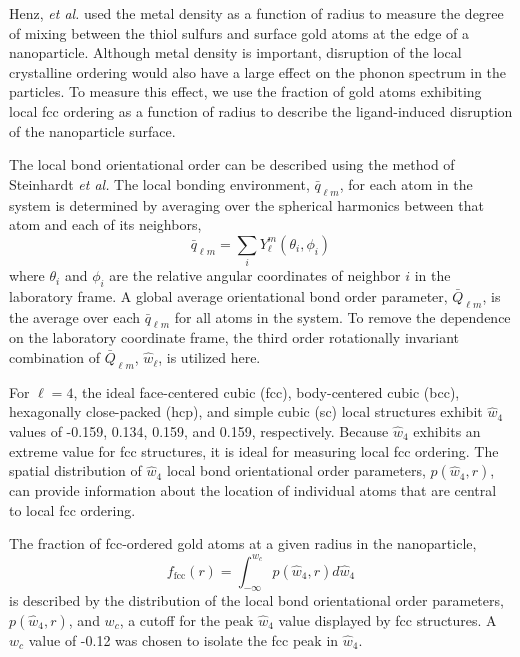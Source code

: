 \documentclass[aps,jcp,preprint,showpacs,superscriptaddress,groupedaddress]{revtex4-1}  %
\begin{document}
Henz, \textit{et al.}\cite{Henz:2008qf} used the metal
density as a function of radius to measure the degree of mixing
between the thiol sulfurs and surface gold atoms at the edge of a
nanoparticle. Although metal density is important, disruption of the
local crystalline ordering would also have a large effect on the
phonon spectrum in the particles. To measure this effect, we use the
fraction of gold atoms exhibiting local fcc ordering as a function of
radius to describe the ligand-induced disruption of the nanoparticle
surface.

The local bond orientational order can be described using the method
of Steinhardt \textit{et al.}\cite{Steinhardt1983} The local bonding
environment, $\bar{q}_{\ell m}$, for each atom in the system is
determined by averaging over the spherical harmonics between that atom
and each of its neighbors,
\begin{equation}
\bar{q}_{\ell m} = \sum_i Y_\ell^m(\theta_i, \phi_i)
\end{equation}
where $\theta_i$ and $\phi_i$ are the relative angular coordinates of
neighbor $i$ in the laboratory frame.  A global average orientational
bond order parameter, $\bar{Q}_{\ell m}$, is the average over each
$\bar{q}_{\ell m}$ for all atoms in the system. To remove the
dependence on the laboratory coordinate frame, the third order
rotationally invariant combination of $\bar{Q}_{\ell m}$,
$\hat{w}_\ell$, is utilized here.\cite{Steinhardt1983,Vardeman:2008fk}

For $\ell=4$, the ideal face-centered cubic (fcc), body-centered cubic
(bcc), hexagonally close-packed (hcp), and simple cubic (sc) local
structures exhibit $\hat{w}_4$ values of -0.159, 0.134, 0.159, and
0.159, respectively. Because $\hat{w}_4$ exhibits an extreme value for
fcc structures, it is ideal for measuring local fcc
ordering. The spatial distribution of $\hat{w}_4$ local bond
orientational order parameters, $p(\hat{w}_4 , r)$, can provide
information about the location of individual atoms that are central to
local fcc ordering.

The fraction of fcc-ordered gold atoms at a given radius in the
nanoparticle,
\begin{equation}
	f_\mathrm{fcc}(r) = \int_{-\infty}^{w_c} p(\hat{w}_4, r) d \hat{w}_4
\end{equation}
is described by the distribution of the local bond orientational order
parameters, $p(\hat{w}_4, r)$, and $w_c$, a cutoff for the peak
$\hat{w}_4$ value displayed by fcc structures. A $w_c$ value of -0.12
was chosen to isolate the fcc peak in $\hat{w}_4$.
\end{document}
